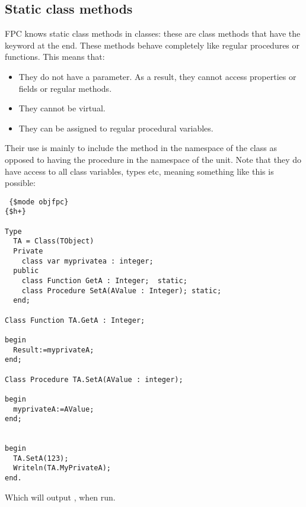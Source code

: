 \subsection{Static class methods}
FPC knows static class methods in classes: these are class methods that have the
 keyword at the end. These methods behave completely like regular 
procedures or functions. This means that:
\begin{itemize}
\item They do not have a  parameter. As a result, they cannot access properties or fields or regular methods.
\item They cannot be virtual.
\item They can be assigned to regular procedural variables.
\end{itemize}
Their use is mainly to include the method in the namespace of the class as
opposed to having the procedure in the namespace of the unit. 
Note that they do have access to all class variables, types etc, meaning something like this is possible:
\begin{verbatim}
 {$mode objfpc}
{$h+}

Type
  TA = Class(TObject)
  Private
    class var myprivatea : integer;
  public
    class Function GetA : Integer;  static;
    class Procedure SetA(AValue : Integer); static;
  end;

Class Function TA.GetA : Integer;

begin
  Result:=myprivateA;
end;

Class Procedure TA.SetA(AValue : integer);

begin
  myprivateA:=AValue;
end;


begin
  TA.SetA(123);
  Writeln(TA.MyPrivateA);
end.
\end{verbatim}
Which will output , when run.

